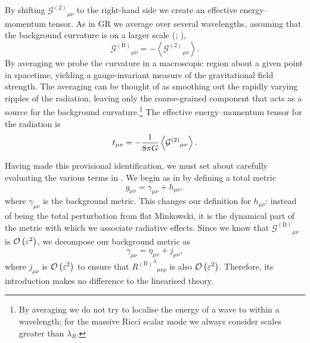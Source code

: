 By shifting ${\mathcal{G}^{(2)}}_{\mu\nu}$ to the right-hand side we create an effective energy--momentum tensor. As in GR we average over several wavelengths, assuming that the background curvature is on a larger scale (\citealt[section 35.13]{Misner1973}; \citealt{Stein2011}),
\begin{equation}
{\mathcal{G}^{(\text{B})}}_{\mu\nu} = -\left\langle{\mathcal{G}^{(2)}}_{\mu\nu}\right\rangle.
\end{equation}
By averaging we probe the curvature in a macroscopic region about a given point in spacetime, yielding a gauge-invariant measure of the gravitational field strength. The averaging can be thought of as smoothing out the rapidly varying ripples of the radiation, leaving only the coarse-grained component that acts as a source for the background curvature.\footnote{By averaging we do not try to localise the energy of a wave to within a wavelength; for the massive Ricci scalar mode we always consider scales greater than $\lambda_R$.} The effective energy--momentum tensor for the radiation is
\begin{equation}
t_{\mu\nu} = -\dfrac{1}{8\pi G}\left\langle{\mathcal{G}^{(\text{2})}}_{\mu\nu}\right\rangle.
\end{equation}

Having made this provisional identification, we must set about carefully evaluating the various terms in . We begin as in  by defining a total metric
\begin{equation}
g_{\mu\nu} = \gamma_{\mu\nu} + h_{\mu\nu},
\end{equation}
where $\gamma_{\mu\nu}$ is the background metric. This changes our definition for $h_{\mu\nu}$: instead of being the total perturbation from flat Minkowski, it is the dynamical part of the metric with which we associate radiative effects. Since we know that ${\mathcal{G}^{(\text{B})}}_{\mu\nu}$ is $\mathcal{O}\left({\varepsilon^2}\right)$, we decompose our background metric as
\begin{equation}
\gamma_{\mu\nu} = \eta_{\mu\nu} + j_{\mu\nu},
\end{equation}
where $j_{\mu\nu}$ is $\mathcal{O}\left({\varepsilon^2}\right)$ to ensure that ${{R^{(\text{B})}}^\lambda}_{\mu\nu\rho}$ is also $\mathcal{O}\left({\varepsilon^2}\right)$. Therefore, its introduction makes no difference to the linearised theory.

